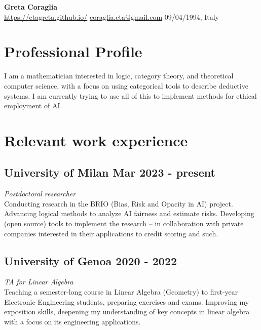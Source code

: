 \documentclass[a4paper,9pt]{article}
\begin{document}
\pagestyle{empty}

\begin{center}
    \textbf{\Huge Greta Coraglia} \\
\vspace{2mm}
     \url{https://etagreta.github.io/}
	\qquad
     \href{mailto:coraglia.eta@gmail.com}{coraglia.eta@gmail.com}
	\qquad
     09/04/1994, Italy
\end{center}


\space
\section*{ Professional Profile}
I am a mathematician interested in logic, category theory, and theoretical computer science, with a focus on using categorical tools to describe deductive systems. I am currently trying to use all of this to implement methods for ethical employment of AI.

\section*{ Relevant work experience}

\subsection*{University of Milan \hfill Mar 2023 - present}
\textit{ Postdoctoral researcher} \\
Conducting research in the BRIO (Bias, Risk and Opacity in AI) project. Advancing logical methods to analyze AI fairness and estimate risks. Developing (open source) tools to implement the research -- in collaboration with private companies interested in their applications to credit scoring and such.%

\subsection*{University of Genoa \hfill 2020 - 2022}
\textit{TA for Linear Algebra}\\
Teaching a semester-long course in Linear Algebra (Geometry) to first-year Electronic Engineering students, preparing exercises and exams. Improving my exposition skills, deepening my understanding of key concepts in linear algebra with a focus on its engineering applications.
\end{document}
